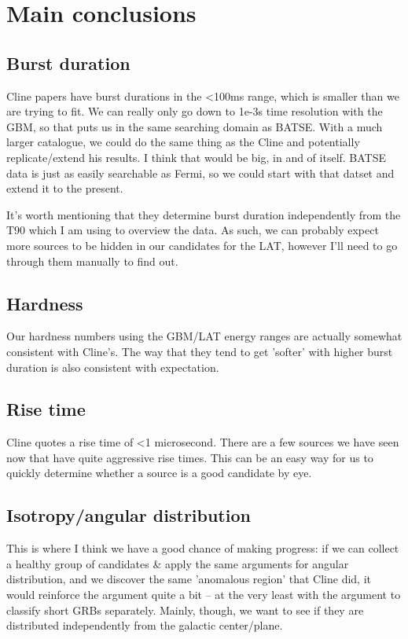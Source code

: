 \documentclass[12pt]{article}
\begin{document}
\tableofcontents

\section{Main conclusions}
\subsection{Burst duration}
Cline papers have burst durations in the <100ms range, which is smaller than we are trying to fit. We can really only go down to 1e-3s time resolution with the GBM, so that puts us in the same searching domain as BATSE. With a much larger catalogue, we could do the same thing as the Cline and potentially replicate/extend his results. I think that would be big, in and of itself. BATSE data is just as easily searchable as Fermi, so we could start with that datset and extend it to the present.

It's worth mentioning that they determine burst duration independently from the T90 which I am using to overview the data. As such, we can probably expect more sources to be hidden in our candidates for the LAT, however I'll need to go through them manually to find out.

\subsection{Hardness}
Our hardness numbers using the GBM/LAT energy ranges are actually somewhat consistent with Cline's. The way that they tend to get 'softer' with higher burst duration is also consistent with expectation.

\subsection{Rise time}
Cline quotes a rise time of <1 microsecond. There are a few sources we have seen now that have quite aggressive rise times. This can be an easy way for us to quickly determine whether a source is a good candidate by eye.

\subsection{Isotropy/angular distribution}
This is where I think we have a good chance of making progress: if we can collect a healthy group of candidates & apply the same arguments for angular distribution, and we discover the same 'anomalous region' that Cline did, it would reinforce the argument quite a bit -- at the very least with the argument to classify short GRBs separately. Mainly, though, we want to see if they are distributed independently from the galactic center/plane.
\end{document}
